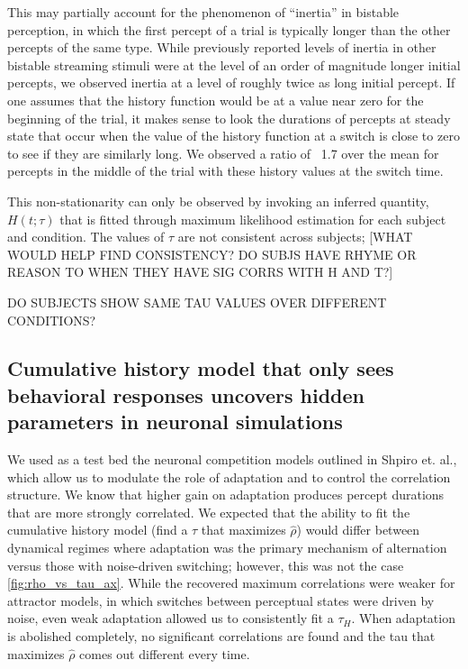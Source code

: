 This may partially account for the phenomenon of “inertia” in bistable perception, in which the first percept of a trial is typically longer than the other percepts of the same type. While previously reported levels of inertia in other bistable streaming stimuli were at the level of an order of magnitude longer initial percepts, we observed inertia at a level of roughly twice as long initial percept. If one assumes that the history function would be at a value near zero for the beginning of the trial, it makes sense to look the durations of percepts at steady state that occur when the value of the history function at a switch is close to zero to see if they are similarly long. We observed a ratio of ~1.7 over the mean for percepts in the middle of the trial with these history values at the switch time.

This non-stationarity can only be observed by invoking an inferred quantity, $H(t; \tau)$ that is fitted through maximum likelihood estimation for each subject and condition. The values of $\tau$ are not consistent across subjects; [WHAT WOULD HELP FIND CONSISTENCY? DO SUBJS HAVE RHYME OR REASON TO WHEN THEY HAVE SIG CORRS WITH H AND T?]

DO SUBJECTS SHOW SAME TAU VALUES OVER DIFFERENT CONDITIONS?

\subsection{Cumulative history model that only sees behavioral responses uncovers hidden parameters in neuronal simulations}

We used as a test bed the neuronal competition models outlined in Shpiro et. al., which allow us to modulate the role of adaptation and to control the correlation structure. We know that higher gain on adaptation produces percept durations that are more strongly correlated. We expected that the ability to fit the cumulative history model (find a $\tau$ that maximizes $\hat{\rho}$) would differ between dynamical regimes where adaptation was the primary mechanism of alternation versus those with noise-driven switching; however, this was not the case \ref{fig:rho_vs_tau_ax}. While the recovered maximum correlations were weaker for attractor models, in which switches between perceptual states were driven by noise, even weak adaptation allowed us to consistently fit a $\tau_H$. When adaptation is abolished completely, no significant correlations are found and the tau that maximizes $\hat{\rho}$ comes out different every time.

